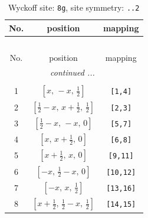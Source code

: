 \documentclass[fleqn,8pt]{jsarticle}
\begin{document}
\renewcommand{\arraystretch}{1.2}
\begin{longtable}{ccc}
\caption{Wyckoff site: {\tt 8g}, site symmetry: {\tt ..2}}
 \\
 \hline \hline
No. & position & mapping \\ \hline \endfirsthead

\multicolumn{2}{l}{\tablename\ \thetable{}} \\
 \hline \hline
No. & position & mapping \\ \hline \endhead

 \hline \hline
\multicolumn{2}{r}{\footnotesize\it continued ...} \\ \endfoot

 \hline \hline
\multicolumn{2}{r}{} \\ \endlastfoot

1 & $\left[ x,\, - x,\, \frac{1}{2} \right]$ & {\tt [1,4]} \\ \hline
2 & $\left[ \frac{1}{2} - x,\, x + \frac{1}{2},\, \frac{1}{2} \right]$ & {\tt [2,3]} \\ \hline
3 & $\left[ \frac{1}{2} - x,\, - x,\, 0 \right]$ & {\tt [5,7]} \\ \hline
4 & $\left[ x,\, x + \frac{1}{2},\, 0 \right]$ & {\tt [6,8]} \\ \hline
5 & $\left[ x + \frac{1}{2},\, x,\, 0 \right]$ & {\tt [9,11]} \\ \hline
6 & $\left[ - x,\, \frac{1}{2} - x,\, 0 \right]$ & {\tt [10,12]} \\ \hline
7 & $\left[ - x,\, x,\, \frac{1}{2} \right]$ & {\tt [13,16]} \\ \hline
8 & $\left[ x + \frac{1}{2},\, \frac{1}{2} - x,\, \frac{1}{2} \right]$ & {\tt [14,15]} \\
\end{longtable}
\renewcommand{\arraystretch}{1.2}
\end{document}
